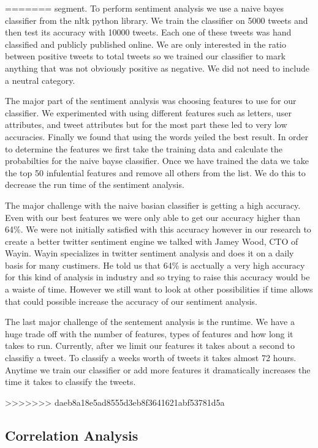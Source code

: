 \documentclass{acm_proc_article-sp}
\begin{document}
=======
segment. To perform sentiment analysis we use a naive bayes classifier from the
nltk python library. We train the classifier on 5000 tweets and then test its
accuracy with 10000 tweets. Each one of these tweets was hand classified and
publicly published online. We are only interested in the ratio between positive
tweets to total tweets so we trained our classifier to mark anything that was
not obviously positive as negative. We did not need to include a neutral
category.

The major part of the sentiment analysis was choosing features to use for our
classifier. We experimented with using different features such as letters, user
attributes, and tweet attributes but for the most part these led to very low
accuracies. Finally we found that using the words yeiled the best result. In
order to determine the features we first take the training data and calculate
the probabilties for the naive bayse classifier. Once we have trained the data
we take the top 50 infulential features and remove all others from the list. We
do this to decrease the run time of the sentiment analysis.

The major challenge with the naive basian classifier is getting a high
accuracy. Even with our best features we were only able to get our accuracy
higher than 64\%.  We were not initially satisfied with this accuracy however
in our research to create a better twitter sentiment engine we talked with
Jamey Wood, CTO of Wayin. Wayin specializes in twitter sentiment analysis and
does it on a daily basis for many custimers. He told us that 64\% is acctually
a very high accuracy for this kind of analysis in industry and so trying to
raise this accuracy would be a waiste of time. However we still want to look at
other possibilities if time allows that could possible increase the accuracy of
our sentiment analysis. 

The last major challenge of the sentement analysis is the runtime. We have a
huge trade off with the number of features, types of features and how long it
takes to run. Currently, after we limit our features it takes about a second to
classifiy a tweet. To classify a weeks worth of tweets it takes almost 72
hours. Anytime we train our classifier or add more features it dramatically
increases the time it takes to classify the tweets.

>>>>>>> daeb8a18e5ad8555d3eb8f3641621abf53781d5a
\subsection{Correlation Analysis}
\end{document}
